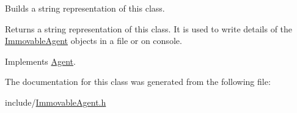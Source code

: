 Builds a string representation of this class. \begin{DoxyReturn}{Returns}
a string representation of this class. It is used to write details of the \mbox{\hyperlink{class_immovable_agent}{Immovable\+Agent}} objects in a file or on console. 
\end{DoxyReturn}


Implements \mbox{\hyperlink{class_agent_a44f291596d10c7878b0641d6ec156328}{Agent}}.



The documentation for this class was generated from the following file\+:\begin{DoxyCompactItemize}
\item 
include/\mbox{\hyperlink{_immovable_agent_8h}{Immovable\+Agent.\+h}}\end{DoxyCompactItemize}
